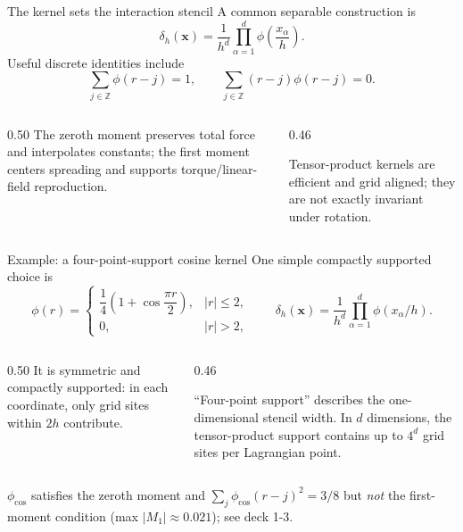\documentclass[aspectratio=169,11pt]{beamer}
\newcommand{\xvec}{\bm{x}}
\begin{document}
\begin{frame}{The kernel sets the interaction stencil}
A common separable construction is
\[
  \delta_h(\xvec)=\frac{1}{h^d}\prod_{\alpha=1}^{d}
  \phi\!\left(\frac{x_\alpha}{h}\right).
\]
Useful discrete identities include
\[
  \sum_{j\in\mathbb{Z}}\phi(r-j)=1,
  \qquad
  \sum_{j\in\mathbb{Z}}(r-j)\phi(r-j)=0.
\]
\begin{columns}[T,onlytextwidth]
\begin{column}{0.50\textwidth}
The zeroth moment preserves total force and interpolates constants; the first moment centers spreading and supports torque/linear-field reproduction.
\end{column}
\begin{column}{0.46\textwidth}
\begin{punchbox}
Tensor-product kernels are efficient and grid aligned; they are not exactly invariant under rotation.
\end{punchbox}
\end{column}
\end{columns}
\end{frame}

\begin{frame}{Example: a four-point-support cosine kernel}
One simple compactly supported choice is
\[
 \phi(r)=
 \begin{cases}
  \dfrac14\left(1+\cos\dfrac{\pi r}{2}\right), & |r|\le 2,\\[6pt]
  0, & |r|>2,
 \end{cases}
 \qquad
 \delta_h(\xvec)=\frac{1}{h^d}\prod_{\alpha=1}^{d}\phi(x_\alpha/h).
\]
\begin{columns}[T,onlytextwidth]
\begin{column}{0.50\textwidth}
It is symmetric and compactly supported: in each coordinate, only grid sites within $2h$ contribute.\par\smallskip
{}
\end{column}
\begin{column}{0.46\textwidth}
\begin{punchbox}
``Four-point support'' describes the one-dimensional stencil width. In $d$ dimensions, the tensor-product support contains up to $4^d$ grid sites per Lagrangian point.
\end{punchbox}
\end{column}
\end{columns}
\smallskip
{} $\phi_{\cos}$ satisfies the zeroth moment and $\sum_j\phi_{\cos}(r-j)^2=3/8$ but \emph{not} the first-moment condition (max $|M_1|\approx0.021$); see deck 1-3.\par
{}
\end{frame}
\end{document}
